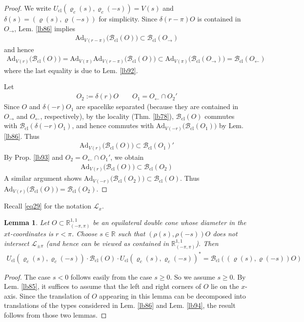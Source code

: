 \documentclass[11pt,b5paper,notitlepage]{article}
\theoremstyle{definition}
\theoremstyle{plain}
\newtheorem{lm}[df]{Lemma}
\newcommand{\scr}{\mathscr}
\newcommand{\Ad}{\mathrm{Ad}}
\newcommand{\Rbb}{\mathbb R}
\newcommand{\Rpp}{\mathbb R^{1,1}_{(-\pi,\pi)}}
\newcommand{\Bcl}{\mathcal B_{\mathrm{cl}}}
\newcommand{\SL}{\mathscr L}
\newcommand{\Ucl}{U_{\mathrm{cl}}}
\numberwithin{equation}{section}
\begin{document}
\begin{proof}
We write $\Ucl(\varrho_c(s),\varrho_c(-s))=V(s)$ and $\delta(s)=(\varrho(s),\varrho(-s))$ for simplicity. 
Since $\delta(r-\pi)O$ is contained in $O_\rightarrow$, Lem. \ref{lb86} implies
\begin{align*}
\Ad_{V(r-\pi)}\big(\Bcl(O)\big)\subset\Bcl(O_\rightarrow)
\end{align*}
and hence
\begin{align*}
\Ad_{V(r)}\big(\Bcl(O)\big)= \Ad_{V(\pi)}\Ad_{V(r-\pi)}\big(\Bcl(O)\big)\subset\Ad_{V(\pi)}\big(\Bcl(O_\rightarrow)\big)=\Bcl(O_\leftarrow)
\end{align*}
where the last equality is due to Lem. \ref{lb92}. 

Let
\begin{align*}
O_2:=\delta(r)O\qquad O_1=O_\leftarrow\cap O_2'
\end{align*}
Since $O$ and $\delta(-r)O_1$ are spacelike separated (because they are contained in $O_\rightarrow$ and $O_\leftarrow$, respectively), by the locality (Thm. \ref{lb78}), $\Bcl(O)$ commutes with $\Bcl(\delta(-r)O_1)$, and hence commutes with $\Ad_{V(-r)}\big(\Bcl(O_1)\big)$ by Lem. \ref{lb86}. Thus
\begin{align*}
\Ad_{V(r)}\big(\Bcl(O)\big)\subset\Bcl(O_1)'
\end{align*}
By Prop. \ref{lb93} and $O_2=O_\leftarrow\cap O_1'$, we obtain
\begin{align*}
\Ad_{V(r)}\big(\Bcl(O)\big)\subset\Bcl(O_2)
\end{align*}
A similar argument shows $\Ad_{V(-r)}\big(\Bcl(O_2)\big)\subset\Bcl(O)$. Thus $\Ad_{V(r)}\big(\Bcl(O)\big)=\Bcl(O_2)$.
\end{proof}


Recall \eqref{eq29} for the notation $\scr L_x$.

\begin{lm}\label{lb95}
Let $O\subset\Rpp$ be an equilateral double cone whose diameter in the $xt$-coordinates is $r<\pi$. Choose $s\in\Rbb$ such that $(\rho(s),\rho(-s))O$ does not intersect $\SL_{\pm\pi}$ (and hence can be viewed as contained in $\Rpp$). Then
\begin{align}\label{eq43}
\Ucl(\varrho_c(s),\varrho_c(-s))\cdot\Bcl(O)\cdot\Ucl(\varrho_c(s),\varrho_c(-s))^*=\Bcl((\varrho(s),\varrho(-s))O)
\end{align}
\end{lm}

\begin{proof}
The case $s<0$ follows easily from the case $s\geq0$. So we assume $s\geq0$. By Lem. \ref{lb85}, it suffices to assume that the left and right corners of $O$ lie on the $x$-axis. Since the translation of $O$ appearing in this lemma can be decomposed into translations of the types considered in Lem. \ref{lb86} and Lem. \ref{lb94}, the result follows from those two lemmas.
\end{proof}
\end{document}
